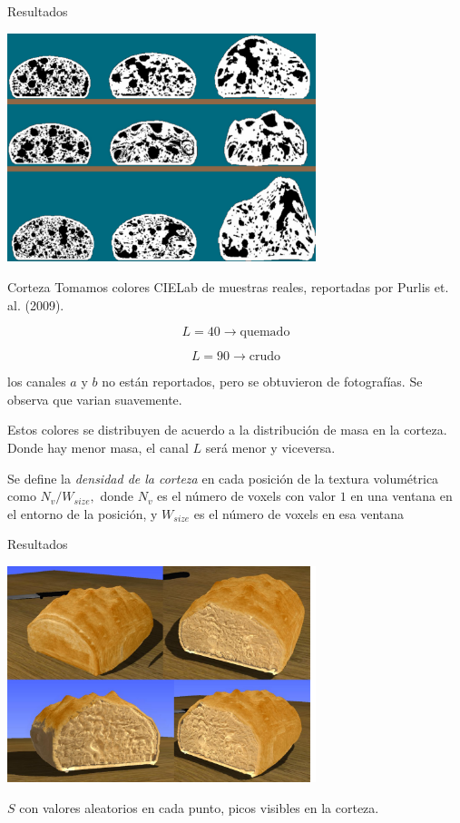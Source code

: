 \documentclass[spanish]{beamer}
\begin{document}
\begin{frame}{Resultados}

\centerline{\includegraphics[width=9cm]{../figures/Fig9}}

\end{frame}

\begin{frame}{Corteza}
Tomamos colores CIELab de muestras reales, reportadas por Purlis et. al. (2009).

$$L = 40 \rightarrow \text{quemado}$$

$$L = 90 \rightarrow \text{crudo}$$

los canales $a$ y $b$ no están reportados, pero se obtuvieron de fotografías. Se observa que varian suavemente.

Estos colores se distribuyen de acuerdo a la distribución de masa en la corteza. Donde hay menor masa, el canal $L$ será menor y viceversa.

Se define la {\em densidad de la corteza} en cada posición de la textura volumétrica como $N_{v} / W_{size},$ donde $N_{v}$ es el número de voxels con valor $1$ en una ventana en el entorno de la posición, y $W_{size}$ es el número de voxels en esa ventana
\end{frame}



\begin{frame}{Resultados}

\centerline{\includegraphics[width=9cm]{../figures/Fig11}}

$S$ con valores aleatorios en cada punto, picos visibles en la corteza.

\end{frame}
\end{document}
